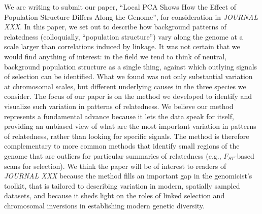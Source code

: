 \documentclass[stdletter,letterpaper,addrfromright,orderfromdateto,dateleft,11pt,noaddrto,sigleft]{newlfm}
\begin{document}
\begin{newlfm}




We are writing to submit our paper,
``Local PCA Shows How the Effect of Population Structure Differs Along the Genome'',
for consideration in \textit{JOURNAL XXX}.
In this paper, we set out to describe how background patterns of relatedness 
(colloquially, ``population structure'')
vary along the genome at a scale larger than correlations induced by linkage.
It was not certain that we would find anything of interest:
in the field we tend to think of neutral, background population structure as a single thing,
against which outlying signals of selection can be identified.
What we found was not only substantial variation at chromosomal scales,
but different underlying causes in the three species we consider.
The focus of our paper is on the method we developed to identify and visualize such variation in patterns of relatedness.
We believe our method represents a fundamental advance because it lets the data speak for itself,
providing an unbiased view of what are the most important variation in patterns of relatedness,
rather than looking for specific signals.
The method is therefore complementary to more common methods that identify small regions of the genome
that are outliers for particular summaries of relatedness (e.g., $F_{ST}$-based scans for selection).
We think the paper will be of interest to readers of \textit{JOURNAL XXX}
because the method fills an important gap in the genomicist's toolkit,
that is tailored to describing variation in modern, spatially sampled datasets,
and because it sheds light on the roles of linked selection and chromosomal inversions in 
establishing modern genetic diversity.


\end{newlfm}
\end{document}

